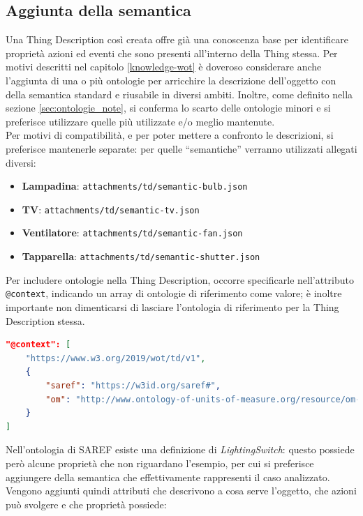 \documentclass[12pt,a4paper,openright,oneside]{report}
\newcommand{\quotes}[1]{``#1''}
\begin{document}
\subsection{Aggiunta della semantica}
\label{sec:adding-semantic}
Una Thing Description così creata offre già una conoscenza base per identificare proprietà azioni ed eventi che sono presenti all'interno della Thing stessa. Per motivi descritti nel capitolo \ref{knowledge-wot} è doveroso considerare anche l'aggiunta di una o più ontologie per arricchire la descrizione dell'oggetto con della semantica standard e riusabile in diversi ambiti. Inoltre, come definito nella sezione \ref{sec:ontologie_note}, si conferma lo scarto delle ontologie minori e si preferisce utilizzare quelle più utilizzate e/o meglio mantenute.\\

Per motivi di compatibilità, e per poter mettere a confronto le descrizioni, si preferisce mantenerle separate: per quelle \quotes{semantiche} verranno utilizzati allegati diversi:
\begin{itemize}
	\setlength\itemsep{-0.3em}
	\item \textbf{Lampadina}: \texttt{attachments/td/semantic-bulb.json}
	\item \textbf{TV}: \texttt{attachments/td/semantic-tv.json}
	\item \textbf{Ventilatore}: \texttt{attachments/td/semantic-fan.json}
	\item \textbf{Tapparella}: \texttt{attachments/td/semantic-shutter.json}
\end{itemize}

Per includere ontologie nella Thing Description, occorre specificarle nell'attributo \texttt{@context}, indicando un array di ontologie di riferimento come valore; è inoltre importante non dimenticarsi di lasciare l'ontologia di riferimento per la Thing Description stessa.

\begin{lstlisting}[language=json,caption={Aggiunta del contesto per includere ontologie},label=lst:semantic-td1]
"@context": [
	"https://www.w3.org/2019/wot/td/v1",
	{
		"saref": "https://w3id.org/saref#",
		"om": "http://www.ontology-of-units-of-measure.org/resource/om-2/"
	}
]
\end{lstlisting}

Nell'ontologia di SAREF esiste una definizione di \textit{LightingSwitch}: questo possiede però alcune proprietà che non riguardano l'esempio, per cui si preferisce aggiungere della semantica che effettivamente rappresenti il caso analizzato. Vengono aggiunti quindi attributi che descrivono a cosa serve l'oggetto, che azioni può svolgere e che proprietà possiede:
\end{document}
